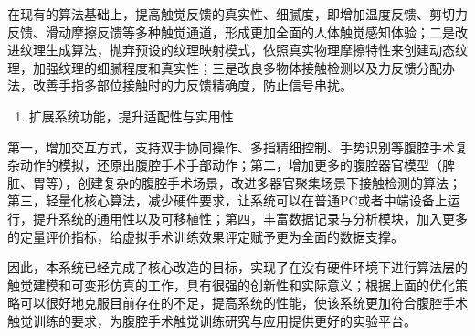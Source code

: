 在现有的算法基础上，提高触觉反馈的真实性、细腻度，即增加温度反馈、剪切力反馈、滑动摩擦反馈等多种触觉通道，形成更加全面的人体触觉感知体验；二是改进纹理生成算法，抛弃预设的纹理映射模式，依照真实物理摩擦特性来创建动态纹理，加强纹理的细腻程度和真实性；三是改良多物体接触检测以及力反馈分配办法，改善手指多部位接触时的力反馈精确度，防止信号串扰。

\begin{enumerate}
\def\labelenumi{\arabic{enumi}.}
\setcounter{enumi}{3}
\item
  扩展系统功能，提升适配性与实用性
\end{enumerate}

第一，增加交互方式，支持双手协同操作、多指精细控制、手势识别等腹腔手术复杂动作的模拟，还原出腹腔手术手部动作；第二，增加更多的腹腔器官模型（脾脏、胃等），创建复杂的腹腔手术场景，改进多器官聚集场景下接触检测的算法；第三，轻量化核心算法，减少硬件要求，让系统可以在普通PC或者中端设备上运行，提升系统的通用性以及可移植性；第四，丰富数据记录与分析模块，加入更多的定量评价指标，给虚拟手术训练效果评定赋予更为全面的数据支撑。

因此，本系统已经完成了核心改造的目标，实现了在没有硬件环境下进行算法层的触觉建模和可变形仿真的工作，具有很强的创新性和实际意义；根据上面的优化策略可以很好地克服目前存在的不足，提高系统的性能，使该系统更加符合腹腔手术触觉训练的要求，为腹腔手术触觉训练研究与应用提供更好的实验平台。
